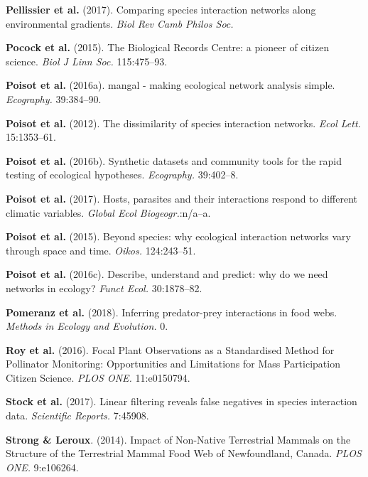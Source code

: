 \leavevmode\hypertarget{ref-PellAlbo17}{}%
\textbf{Pellissier et al.} (2017). Comparing species interaction
networks along environmental gradients. \emph{Biol Rev Camb Philos Soc.}

\leavevmode\hypertarget{ref-PocoRoy15}{}%
\textbf{Pocock et al.} (2015). The Biological Records Centre: a pioneer
of citizen science. \emph{Biol J Linn Soc.} 115:475--93.

\leavevmode\hypertarget{ref-PoisBais16}{}%
\textbf{Poisot et al.} (2016a). mangal - making ecological network
analysis simple. \emph{Ecography.} 39:384--90.

\leavevmode\hypertarget{ref-PoisCana12}{}%
\textbf{Poisot et al.} (2012). The dissimilarity of species interaction
networks. \emph{Ecol Lett.} 15:1353--61.

\leavevmode\hypertarget{ref-PoisGrav16}{}%
\textbf{Poisot et al.} (2016b). Synthetic datasets and community tools
for the rapid testing of ecological hypotheses. \emph{Ecography.}
39:402--8.

\leavevmode\hypertarget{ref-PoisGuev17}{}%
\textbf{Poisot et al.} (2017). Hosts, parasites and their interactions
respond to different climatic variables. \emph{Global Ecol
Biogeogr.}:n/a--a.

\leavevmode\hypertarget{ref-PoisStou15}{}%
\textbf{Poisot et al.} (2015). Beyond species: why ecological
interaction networks vary through space and time. \emph{Oikos.}
124:243--51.

\leavevmode\hypertarget{ref-PoisStou16}{}%
\textbf{Poisot et al.} (2016c). Describe, understand and predict: why do
we need networks in ecology? \emph{Funct Ecol.} 30:1878--82.

\leavevmode\hypertarget{ref-PomeThom18}{}%
\textbf{Pomeranz et al.} (2018). Inferring predator-prey interactions in
food webs. \emph{Methods in Ecology and Evolution.} 0.

\leavevmode\hypertarget{ref-RoyBaxt16}{}%
\textbf{Roy et al.} (2016). Focal Plant Observations as a Standardised
Method for Pollinator Monitoring: Opportunities and Limitations for Mass
Participation Citizen Science. \emph{PLOS ONE.} 11:e0150794.

\leavevmode\hypertarget{ref-StocPois17}{}%
\textbf{Stock et al.} (2017). Linear filtering reveals false negatives
in species interaction data. \emph{Scientific Reports.} 7:45908.

\leavevmode\hypertarget{ref-StroLero14}{}%
\textbf{Strong \& Leroux}. (2014). Impact of Non-Native Terrestrial
Mammals on the Structure of the Terrestrial Mammal Food Web of
Newfoundland, Canada. \emph{PLOS ONE.} 9:e106264.


